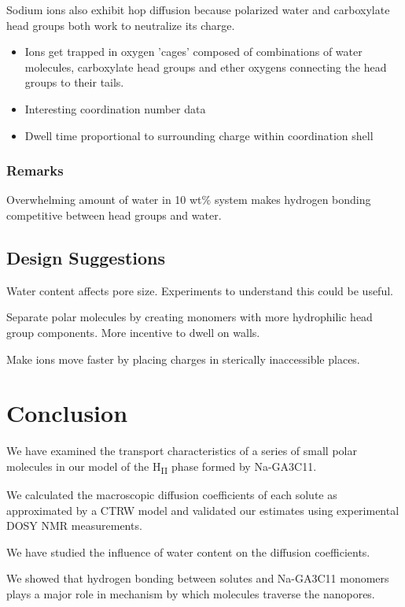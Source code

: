 \documentclass{article}
\begin{document}
  Sodium ions also exhibit hop diffusion because polarized water and
  carboxylate head groups both work to neutralize its charge.
  \begin{itemize}
	\item Ions get trapped in oxygen 'cages' composed of combinations
	of water molecules, carboxylate head groups and ether oxygens connecting
	the head groups to their tails.
  	\item Interesting coordination number data
	\item Dwell time proportional to surrounding charge within coordination shell
  \end{itemize}

  \subsubsection*{Remarks}
   
  Overwhelming amount of water in 10 wt\% system makes hydrogen bonding
  competitive between head groups and water.

  \subsection{Design Suggestions}

  Water content affects pore size. Experiments to understand this could be useful.

  Separate polar molecules by creating monomers with more hydrophilic head group components.
  More incentive to dwell on walls.

  Make ions move faster by placing charges in sterically inaccessible places. 

  \section{Conclusion}

  We have examined the transport characteristics of a series of small polar
  molecules in our model of the H\textsubscript{II} phase formed by 
  Na-GA3C11.

  We calculated the macroscopic diffusion coefficients of each solute as 
  approximated by a CTRW model and validated our estimates using experimental
  DOSY NMR measurements.

  We have studied the influence of water content on the diffusion coefficients.

  We showed that hydrogen bonding between solutes and Na-GA3C11 monomers plays
  a major role in mechanism by which molecules traverse the nanopores. 
\end{document}
